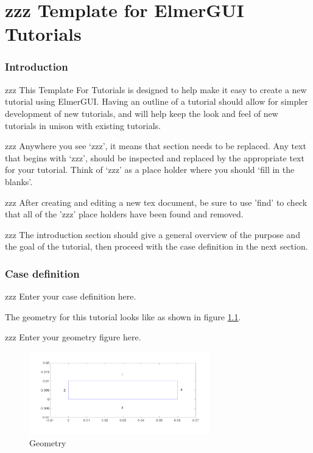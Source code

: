 \chapter{zzz Template for ElmerGUI Tutorials}



\subsection*{Introduction}

zzz This Template For Tutorials is designed to help make it easy to create a new tutorial using ElmerGUI.  Having an outline of a tutorial should allow for simpler development of new tutorials, and will help keep the look and feel of new tutorials in unison with existing tutorials.

zzz Anywhere you see `zzz', it means that section needs to be replaced.  Any text that begins with `zzz', should be inspected and replaced by the appropriate text for your tutorial.  Think of `zzz' as a place holder where you should `fill in the blanks'.

zzz After creating and editing a new tex document, be sure to use 'find' to check that all of the 'zzz' place holders have been found and removed.

zzz The introduction section should give a general overview of the purpose and the goal of the tutorial, then proceed with the case definition in the next section.

\subsection*{Case definition}

zzz Enter your case definition here.

The geometry for this tutorial looks like as shown in figure \ref{fg:geometry}.

zzz Enter your geometry figure here.

\begin{figure}[H]
\centering
\includegraphics[width=0.7\textwidth]{geometry.png}
\caption{Geometry}\label{fg:geometry}
\end{figure}  

